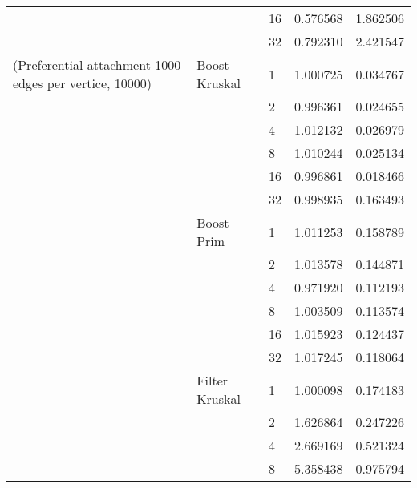 \begin{tabular}{lllrr}
                                                       &                     & 16 &  0.576568 &  1.862506 \\
                                                       &                     & 32 &  0.792310 &  2.421547 \\
(Preferential attachment 1000 edges per vertice, 10000) & Boost Kruskal & 1  &  1.000725 &  0.034767 \\
                                                       &                     & 2  &  0.996361 &  0.024655 \\
                                                       &                     & 4  &  1.012132 &  0.026979 \\
                                                       &                     & 8  &  1.010244 &  0.025134 \\
                                                       &                     & 16 &  0.996861 &  0.018466 \\
                                                       &                     & 32 &  0.998935 &  0.163493 \\
                                                       & Boost Prim & 1  &  1.011253 &  0.158789 \\
                                                       &                     & 2  &  1.013578 &  0.144871 \\
                                                       &                     & 4  &  0.971920 &  0.112193 \\
                                                       &                     & 8  &  1.003509 &  0.113574 \\
                                                       &                     & 16 &  1.015923 &  0.124437 \\
                                                       &                     & 32 &  1.017245 &  0.118064 \\
                                                       & Filter Kruskal & 1  &  1.000098 &  0.174183 \\
                                                       &                     & 2  &  1.626864 &  0.247226 \\
                                                       &                     & 4  &  2.669169 &  0.521324 \\
                                                       &                     & 8  &  5.358438 &  0.975794 \\

\end{tabular}
